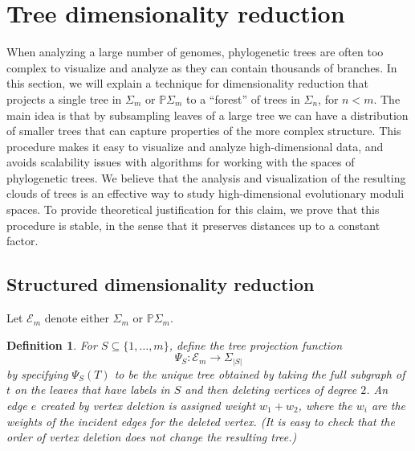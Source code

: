 \documentclass[a4paper,11pt]{article}
\newtheorem{definition}[theorem]{Definition}
\newcommand{\aE}{\mathcal{E}}
\begin{document}
\section{Tree dimensionality reduction}\label{sec:treedimred}

When analyzing a large number of genomes, phylogenetic trees are often too complex to visualize and analyze as they can contain thousands of branches.
In this section, we will explain a technique for dimensionality reduction that projects a single tree in $\Sigma_m$ or $\mathbb{P}\Sigma_m$ to a ``forest'' of trees in $\Sigma_{n}$, for $n < m$.
The main idea is that by subsampling leaves of a large tree we can have a distribution of smaller trees that can capture properties of the more complex structure.
This procedure makes it easy to visualize and analyze high-dimensional data, and avoids scalability issues with algorithms for working with the spaces of phylogenetic trees.
We believe that the analysis and visualization of the resulting clouds of trees is an effective way to study high-dimensional evolutionary moduli spaces.
To provide theoretical justification for this claim, we prove that this procedure is stable, in the sense that it preserves distances up to a constant factor.

\subsection{Structured dimensionality reduction}

Let $\aE_m$ denote either $\Sigma_m$ or $\mathbb{P}\Sigma_m$.

\begin{definition}
For $S \subseteq \{1,\ldots,m\}$, define the tree projection function 
\[
\Psi_S \colon \aE_m \to \Sigma_{|S|}
\] 
by specifying $\Psi_S(T)$ to be the unique tree obtained by taking the full subgraph of $t$ on the leaves that have labels in $S$ and then deleting vertices of degree $2$.
An edge $e$ created by vertex deletion is assigned weight $w_1 + w_2$, where the $w_i$ are the weights of the incident edges for the deleted vertex.
(It is easy to check that the order of vertex deletion does not change the resulting tree.)
\end{definition}
\end{document}
